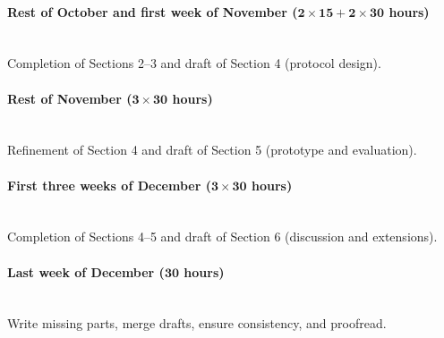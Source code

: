 \documentclass{article}
\newcommand{\timeest}[1]{$\mathbf{#1}$}%
\begin{document}
\paragraph{Rest of October and first week of November (\timeest{2\times 15+2\times 30} hours)}~\\\noindent
Completion of Sections 2--3 and draft of Section 4 (protocol design).

\paragraph{Rest of November (\timeest{3\times 30} hours)}~\\\noindent
Refinement of Section 4 and draft of Section 5 (prototype and evaluation).

\paragraph{First three weeks of December (\timeest{3\times 30} hours)}~\\\noindent
Completion of Sections 4--5 and draft of Section 6 (discussion and extensions).

\paragraph{Last week of December (\timeest{30} hours)}~\\\noindent
Write missing parts, merge drafts, ensure consistency, and proofread.
\end{document}
